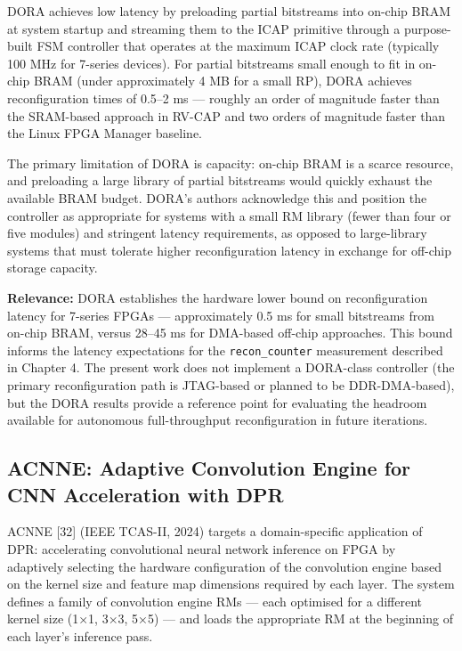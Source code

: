DORA achieves low latency by preloading partial bitstreams into on-chip BRAM at system startup and streaming them to the ICAP primitive through a purpose-built FSM controller that operates at the maximum ICAP clock rate (typically 100 MHz for 7-series devices). For partial bitstreams small enough to fit in on-chip BRAM (under approximately 4 MB for a small RP), DORA achieves reconfiguration times of 0.5–2 ms — roughly an order of magnitude faster than the SRAM-based approach in RV-CAP and two orders of magnitude faster than the Linux FPGA Manager baseline.

The primary limitation of DORA is capacity: on-chip BRAM is a scarce resource, and preloading a large library of partial bitstreams would quickly exhaust the available BRAM budget. DORA's authors acknowledge this and position the controller as appropriate for systems with a small RM library (fewer than four or five modules) and stringent latency requirements, as opposed to large-library systems that must tolerate higher reconfiguration latency in exchange for off-chip storage capacity.

\textbf{Relevance:} DORA establishes the hardware lower bound on reconfiguration latency for 7-series FPGAs — approximately 0.5 ms for small bitstreams from on-chip BRAM, versus 28–45 ms for DMA-based off-chip approaches. This bound informs the latency expectations for the \texttt{recon\_counter} measurement described in Chapter 4. The present work does not implement a DORA-class controller (the primary reconfiguration path is JTAG-based or planned to be DDR-DMA-based), but the DORA results provide a reference point for evaluating the headroom available for autonomous full-throughput reconfiguration in future iterations.

\subsection{ACNNE: Adaptive Convolution Engine for CNN Acceleration with DPR}

ACNNE [32] (IEEE TCAS-II, 2024) targets a domain-specific application of DPR: accelerating convolutional neural network inference on FPGA by adaptively selecting the hardware configuration of the convolution engine based on the kernel size and feature map dimensions required by each layer. The system defines a family of convolution engine RMs — each optimised for a different kernel size (1×1, 3×3, 5×5) — and loads the appropriate RM at the beginning of each layer's inference pass.

